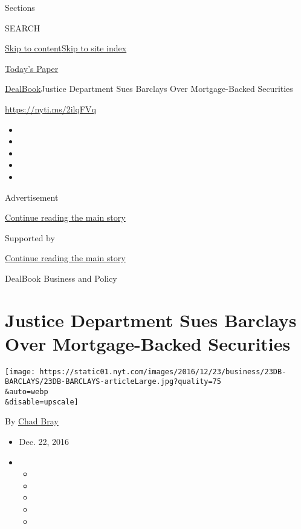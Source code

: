 Sections

SEARCH

\protect\hyperlink{site-content}{Skip to
content}\protect\hyperlink{site-index}{Skip to site index}

\href{https://myaccount.nytimes.com/auth/login?response_type=cookie\&client_id=vi}{}

\href{https://www.nytimes.com/section/todayspaper}{Today's Paper}

\href{/section/business/dealbook}{DealBook}\textbar{}Justice Department
Sues Barclays Over Mortgage-Backed Securities

\url{https://nyti.ms/2ilqFVq}

\begin{itemize}
\item
\item
\item
\item
\item
\end{itemize}

Advertisement

\protect\hyperlink{after-top}{Continue reading the main story}

Supported by

\protect\hyperlink{after-sponsor}{Continue reading the main story}

DealBook Business and Policy

\hypertarget{justice-department-sues-barclays-over-mortgage-backed-securities}{%
\section{Justice Department Sues Barclays Over Mortgage-Backed
Securities}\label{justice-department-sues-barclays-over-mortgage-backed-securities}}

\texttt{[image: https://static01.nyt.com/images/2016/12/23/business/23DB-BARCLAYS/23DB-BARCLAYS-articleLarge.jpg?quality=75\\\&auto=webp\\\&disable=upscale]}

By \href{http://www.nytimes.com/by/chad-bray}{Chad Bray}

\begin{itemize}
\item
  Dec. 22, 2016
\item
  \begin{itemize}
  \item
  \item
  \item
  \item
  \item
  \end{itemize}
\end{itemize}

